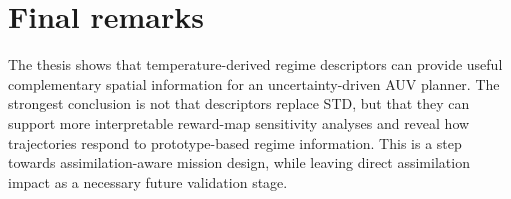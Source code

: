 \section{Final remarks}

The thesis shows that temperature-derived regime descriptors can provide useful complementary spatial information for an uncertainty-driven AUV planner. The strongest conclusion is not that descriptors replace STD, but that they can support more interpretable reward-map sensitivity analyses and reveal how trajectories respond to prototype-based regime information. This is a step towards assimilation-aware mission design, while leaving direct assimilation impact as a necessary future validation stage.
